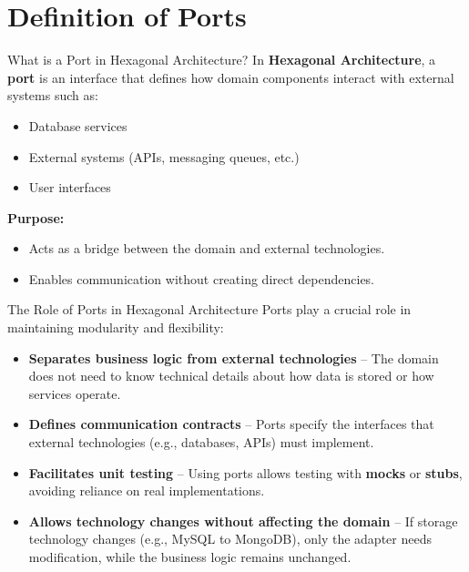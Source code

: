 \documentclass[aspectratio=169, table]{beamer}
\begin{document}
\section{Definition of Ports}

\begin{frame}[fragile]{What is a Port in Hexagonal Architecture?}
	\vspace{20pt}
	In \textbf{Hexagonal Architecture}, a \textbf{port} is an interface that defines how domain components interact with external systems such as:
	\begin{itemize}
		\item Database services
		\item External systems (APIs, messaging queues, etc.)
		\item User interfaces
	\end{itemize}
	\textbf{Purpose:}  
	\begin{itemize}
		\item Acts as a bridge between the domain and external technologies.
		\item Enables communication without creating direct dependencies.
	\end{itemize}
\end{frame}

\begin{frame}[fragile]{The Role of Ports in Hexagonal Architecture}
	\vspace{20pt}
	Ports play a crucial role in maintaining modularity and flexibility:
	\begin{itemize}
		\item \textbf{Separates business logic from external technologies}  
		– The domain does not need to know technical details about how data is stored or how services operate.
		\item \textbf{Defines communication contracts}  
		– Ports specify the interfaces that external technologies (e.g., databases, APIs) must implement.
		\item \textbf{Facilitates unit testing}  
		– Using ports allows testing with \textbf{mocks} or \textbf{stubs}, avoiding reliance on real implementations.
		\item \textbf{Allows technology changes without affecting the domain}  
		– If storage technology changes (e.g., MySQL to MongoDB), only the adapter needs modification, while the business logic remains unchanged.
	\end{itemize}
\end{frame}
\end{document}
